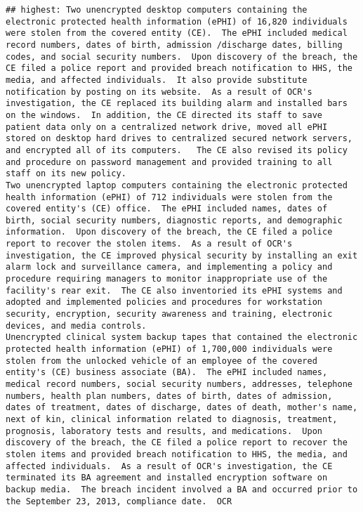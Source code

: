 \documentclass[
]{article}
\begin{document}
\begin{verbatim}
## highest: Two unencrypted desktop computers containing the electronic protected health information (ePHI) of 16,820 individuals were stolen from the covered entity (CE).  The ePHI included medical record numbers, dates of birth, admission /discharge dates, billing codes, and social security numbers.  Upon discovery of the breach, the CE filed a police report and provided breach notification to HHS, the media, and affected individuals.  It also provide substitute notification by posting on its website.  As a result of OCR's investigation, the CE replaced its building alarm and installed bars on the windows.  In addition, the CE directed its staff to save patient data only on a centralized network drive, moved all ePHI stored on desktop hard drives to centralized secured network servers, and encrypted all of its computers.   The CE also revised its policy and procedure on password management and provided training to all staff on its new policy.                                                                                                                                                                                                                 Two unencrypted laptop computers containing the electronic protected health information (ePHI) of 712 individuals were stolen from the covered entity's (CE) office.  The ePHI included names, dates of birth, social security numbers, diagnostic reports, and demographic information.  Upon discovery of the breach, the CE filed a police report to recover the stolen items.  As a result of OCR's investigation, the CE improved physical security by installing an exit alarm lock and surveillance camera, and implementing a policy and procedure requiring managers to monitor inappropriate use of the facility's rear exit.  The CE also inventoried its ePHI systems and adopted and implemented policies and procedures for workstation security, encryption, security awareness and training, electronic devices, and media controls.                                                                                                                                                                                                                                                                                                                                               Unencrypted clinical system backup tapes that contained the electronic protected health information (ePHI) of 1,700,000 individuals were stolen from the unlocked vehicle of an employee of the covered entity's (CE) business associate (BA).  The ePHI included names, medical record numbers, social security numbers, addresses, telephone numbers, health plan numbers, dates of birth, dates of admission, dates of treatment, dates of discharge, dates of death, mother's name, next of kin, clinical information related to diagnosis, treatment, prognosis, laboratory tests and results, and medications.  Upon discovery of the breach, the CE filed a police report to recover the stolen items and provided breach notification to HHS, the media, and affected individuals.  As a result of OCR's investigation, the CE terminated its BA agreement and installed encryption software on backup media.  The breach incident involved a BA and occurred prior to the September 23, 2013, compliance date.  OCR 
\end{verbatim}
\end{document}
